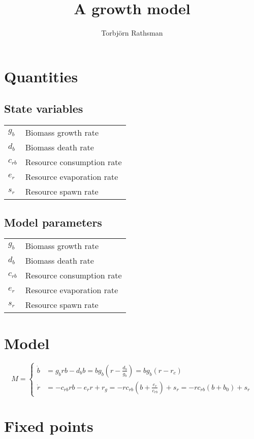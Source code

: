 \documentclass[a4paper, 12pt]{scrartcl}
\title{A growth model}
\author{Torbjörn Rathsman}
\begin{document}
\maketitle
\section{Quantities}
\subsection{State variables}
\begin{tabular}{ll}
  $g_b$ & Biomass growth rate \\
 $d_b$ & Biomass death rate \\
 $c_{rb}$ & Resource consumption rate \\
 $e_r$ & Resource evaporation rate \\
 $s_r$ & Resource spawn rate \\
\end{tabular}
\subsection{Model parameters}
\begin{tabular}{ll}
  $g_b$ & Biomass growth rate \\
 $d_b$ & Biomass death rate \\
 $c_{rb}$ & Resource consumption rate \\
 $e_r$ & Resource evaporation rate \\
 $s_r$ & Resource spawn rate \\
\end{tabular}

\section{Model}
\begin{equation}
M=
\left\{
 \begin{aligned}
  \dot{b} &= g_b rb - d_b b =  b g_b\left(r - \frac{d_b}{g_b}\right) = b g_b\left(r - r_c\right) \\
  \dot{r} &= -c_{rb} r b - e_r r + r_g = -rc_{rb}\left(b + \frac{e_r}{c_{rb}}\right) +s_r = -rc_{rb}\left(b + b_0\right) +s_r
 \end{aligned}
 \right.
\end{equation}

\section{Fixed points}
\end{document}
